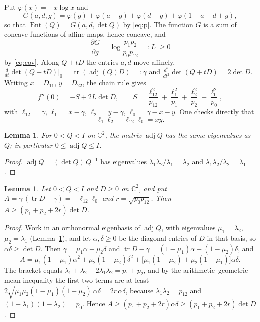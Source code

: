 \documentclass[11pt]{amsart}
\newtheorem{lemma}[theorem]{Lemma}
\theoremstyle{remark}
\numberwithin{equation}{section}
\newcommand{\Ent}{\operatorname{Ent}}
\newcommand{\tr}{\operatorname{tr}}
\newcommand{\adj}{\operatorname{adj}}
\begin{document}
Put $\varphi(x)=-x\log x$ and
\[
G(a,d,g)=\varphi(g)+\varphi(a-g)+\varphi(d-g)+\varphi(1-a-d+g),
\]
so that $\Ent(Q)=G(a,d,\det Q)$ by \eqref{eq:p}. The function $G$ is a sum of concave functions of affine maps, hence concave, and
\begin{equation}\label{eq:L}
\frac{\partial G}{\partial g}=\log\frac{p_1p_2}{p_0p_{12}}=:L\;\ge0
\end{equation}
by \eqref{eq:cov}. Along $Q+tD$ the entries $a,d$ move affinely, $\frac{d}{dt}\det(Q+tD)\big|_{0}=\tr(\adj(Q)D)=:\gamma$ and $\frac{d^2}{dt^2}\det(Q+tD)=2\det D$. Writing $x=D_{11}$, $y=D_{22}$, the chain rule gives
\begin{equation}\label{eq:f2}
f''(0)=-S+2L\det D,\qquad S=\frac{\ell_{12}^2}{p_{12}}+\frac{\ell_1^2}{p_1}+\frac{\ell_2^2}{p_2}+\frac{\ell_0^2}{p_0},
\end{equation}
with $\ell_{12}=\gamma$, $\ell_1=x-\gamma$, $\ell_2=y-\gamma$, $\ell_0=\gamma-x-y$. One checks directly that
\begin{equation}\label{eq:id}
\ell_1\ell_2-\ell_{12}\ell_0=xy .
\end{equation}

\begin{lemma}\label{lem:adj}
For $0<Q<I$ on $\mathbb C^2$, the matrix $\adj Q$ has the same eigenvalues as $Q$; in particular $0\le\adj Q\le I$.
\end{lemma}

\begin{proof}
$\adj Q=(\det Q)\,Q^{-1}$ has eigenvalues $\lambda_1\lambda_2/\lambda_1=\lambda_2$ and $\lambda_1\lambda_2/\lambda_2=\lambda_1$.
\end{proof}

\begin{lemma}\label{lem:A}
Let $0<Q<I$ and $D\ge0$ on $\mathbb C^2$, and put $A=\gamma\,(\tr D-\gamma)=-\ell_{12}\ell_0$ and $r=\sqrt{p_0p_{12}}$. Then $A\ge(p_1+p_2+2r)\det D$.
\end{lemma}

\begin{proof}
Work in an orthonormal eigenbasis of $\adj Q$, with eigenvalues $\mu_1=\lambda_2$, $\mu_2=\lambda_1$ (Lemma~\ref{lem:adj}), and let $\alpha,\delta\ge0$ be the diagonal entries of $D$ in that basis, so $\alpha\delta\ge\det D$. Then $\gamma=\mu_1\alpha+\mu_2\delta$ and $\tr D-\gamma=(1-\mu_1)\alpha+(1-\mu_2)\delta$, and
\[
A=\mu_1(1-\mu_1)\alpha^2+\mu_2(1-\mu_2)\delta^2+\bigl[\mu_1(1-\mu_2)+\mu_2(1-\mu_1)\bigr]\alpha\delta .
\]
The bracket equals $\lambda_1+\lambda_2-2\lambda_1\lambda_2=p_1+p_2$, and by the arithmetic--geometric mean inequality the first two terms are at least $2\sqrt{\mu_1\mu_2(1-\mu_1)(1-\mu_2)}\,\alpha\delta=2r\,\alpha\delta$, because $\lambda_1\lambda_2=p_{12}$ and $(1-\lambda_1)(1-\lambda_2)=p_0$. Hence $A\ge(p_1+p_2+2r)\alpha\delta\ge(p_1+p_2+2r)\det D$.
\end{proof}
\end{document}
